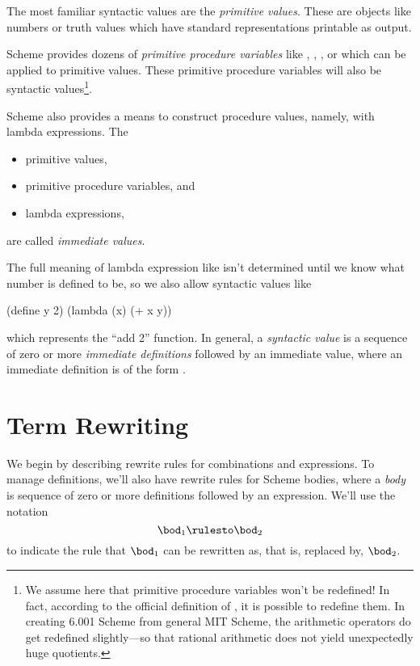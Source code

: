 \documentclass[11pt]{article}
\begin{document}
The most familiar syntactic values are the {\em primitive values}.  These
are objects like numbers or truth values which have standard
representations printable as output.

Scheme provides dozens of {\em primitive procedure variables} like
\Code{+}, \Code{<}, , or  which can be applied to
primitive values.  These primitive procedure variables will also be
syntactic values\footnote{We assume here that primitive procedure
variables won't be redefined!  In fact, according to the official
definition of \RFS, it is possible to redefine them.  In creating 6.001
Scheme from general MIT Scheme, the arithmetic operators do get redefined
slightly---so that rational arithmetic does not yield unexpectedly huge
quotients.}.

Scheme also provides a means to construct procedure values, namely, with
lambda expressions.  The
\begin{itemize}
\item primitive values,
\item primitive procedure variables, and
\item lambda expressions,
\end{itemize} are called {\em immediate values}.

The full meaning of lambda expression like 
isn't determined until we know what number  is defined to be, so
we also allow syntactic values like
\begin{lisp}
(define y 2)
(lambda (x) (+ x y))
\end{lisp}
which represents the ``add 2'' function.  In general, a {\em syntactic
value} is a sequence of zero or more {\em immediate definitions} followed
by an immediate value, where an immediate definition is of the form
.


\section{Term Rewriting}

We begin by describing rewrite rules for combinations and 
expressions.  To manage definitions, we'll also have rewrite rules for
Scheme bodies, where a {\em body} is sequence of zero or more definitions
followed by an expression.  We'll use the notation
\[\bod_{1} \rulesto \bod_{2}\]
to indicate the rule that $\bod_{1}$ can be rewritten as, that is, replaced
by, $\bod_2$.
\end{document}
